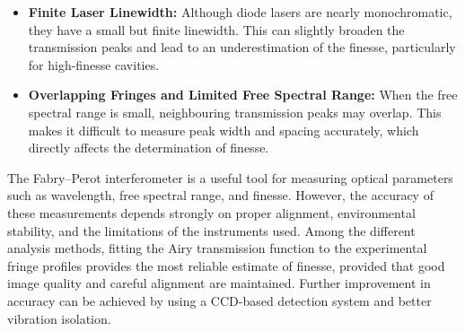 \begin{itemize}
    \item \textbf{Finite Laser Linewidth:}  
    Although diode lasers are nearly monochromatic, they have a small but finite linewidth. This can slightly broaden the transmission peaks and lead to an underestimation of the finesse, particularly for high-finesse cavities.

    \item \textbf{Overlapping Fringes and Limited Free Spectral Range:}  
    When the free spectral range is small, neighbouring transmission peaks may overlap. This makes it difficult to measure peak width and spacing accurately, which directly affects the determination of finesse.
\end{itemize}

The Fabry--Perot interferometer is a useful tool for measuring optical parameters such as wavelength, free spectral range, and finesse. However, the accuracy of these measurements depends strongly on proper alignment, environmental stability, and the limitations of the instruments used. Among the different analysis methods, fitting the Airy transmission function to the experimental fringe profiles provides the most reliable estimate of finesse, provided that good image quality and careful alignment are maintained. Further improvement in accuracy can be achieved by using a CCD-based detection system and better vibration isolation.


